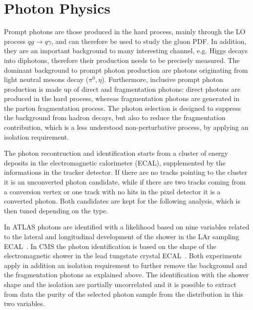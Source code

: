 \documentclass{PoS}
\begin{document}
\section{Photon Physics}

Prompt photons are those produced in the hard process, mainly through the LO process $qg \to q\gamma$, and can therefore
be used to study the gluon PDF. In addition, they are an important background to many interesting channel, e.g. Higgs
decays into diphotons, therefore their production needs to be precisely measured.  
The dominant background to prompt photon production are photons originating from light neutral mesons decay ($\pi^0,
\eta$). Furthermore, inclusive prompt photon production is made up of direct and fragmentation photons: direct photons
are produced in the hard process, whereas fragmentation photons are generated in the parton fragmentation process. The
photon selection is designed to suppress the background from hadron decays, but also to reduce the fragmentation
contribution, which is a less understood non-perturbative process, by applying an isolation requirement. 

The photon recontruction and identification starts from a cluster of energy deposits in the electromagnetic calorimeter
(ECAL), supplemented by the informations in the tracker detector. If there are no tracks pointing to the cluster it is an
unconverted photon candidate, while if there are two tracks coming from a conversion vertex or one track with no hits in
the pixel detector it is a converted photon. Both candidates are kept for the following analysis, which is then tuned
depending on the type. 

In ATLAS photons are identified with a likelihood based on nine variables related to the lateral and longitudinal
development of the shower in the LAr sampling ECAL~\cite{ATLAS:2012ana}. In CMS the photon identification is
based on the shape of the electromagnetic shower in the lead tungstate crystal ECAL~\cite{Chatrchyan:2013dga}.
Both experiments apply in addition an isolation requirement to further remove the background and the fragmentation
photons as explained above. The identification with the shower shape and the isolation are partially uncorrelated and
it is possible to extract from data the purity of the selected photon sample from the distribution in this two variables. 
\end{document}
